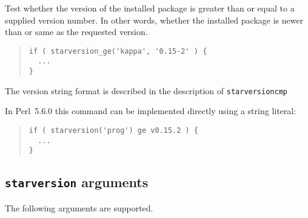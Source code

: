 \documentclass[twoside,11pt]{article}
\newenvironment{myquote}{\begin{quote}\begin{small}}{\end{small}\end{quote}}
\newcommand{\perl}{\xref{\textsf{Perl}}{sun193}{}}
\newcommand{\xref}[3]{#1}
\renewcommand{\_}{\texttt{\symbol{95}}}
\begin{document}
\begin{description}
Test whether the version of the installed package is greater than 
or equal to a supplied version number. In other words, whether the installed
package is newer than or same as the requested version.

\begin{myquote}
\begin{verbatim}
if ( starversion_ge('kappa', '0.15-2' ) {
  ...
}
\end{verbatim}
\end{myquote}

The version string format is described in the description of
\texttt{starversion\_cmp}



In \perl\ 5.6.0 this command can be implemented directly using a 
string literal:

\begin{myquote}
\begin{verbatim}
if ( starversion('prog') ge v0.15.2 ) {
  ...
}
\end{verbatim}
\end{myquote}

\end{description}

\subsection{\texttt{starversion} arguments\label{starversion}}

The following arguments are supported.
\end{document}
